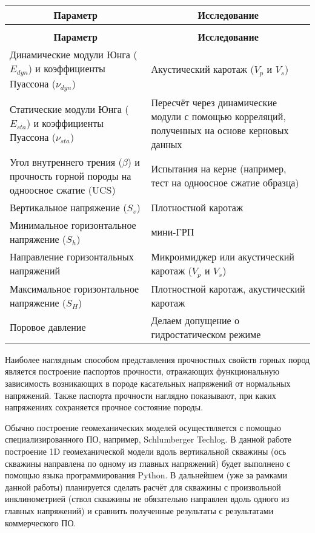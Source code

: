 \small %
\begin{longtable}[c]{|p{8cm}|p{8cm}|}
	\caption{Исходные данные для построения геомеханической модели}%
	\label{tab:long:invest}%
	\\
	\hline
	\multicolumn{1}{|c|}{\textbf{Параметр}}&\multicolumn{1}{|c|}{\textbf{Исследование}}\\ \hline
	\endfirsthead%
	\captionsetup{format=tablenocaption,labelformat=continued} %
	\caption[]{}\\ %
	\hline
	\multicolumn{1}{|c|}{\textbf{Параметр}}&\multicolumn{1}{|c|}{\textbf{Исследование}}\\ \hline
	\endhead
	\hline
	\endfoot
	\hline
	\endlastfoot
	Динамические модули Юнга ($E_{dyn}$) и коэффициенты Пуассона ($\nu_{dyn}$) & Акустический каротаж ($V_p$ и $V_s$)\\ \hline \hline
	Статические модули Юнга ($E_{sta}$) и коэффициенты Пуассона ($\nu_{sta}$) & Пересчёт через динамические модули с помощью корреляций, полученных на основе керновых данных\\ \hline
	Угол внутреннего трения ($\beta$) и прочность горной породы на одноосное сжатие (UCS) & Испытания на керне (например, тест на одноосное сжатие образца)\\ \hline
	Вертикальное напряжение ($S_v$) & Плотностной каротаж\\ \hline
	Минимальное горизонтальное напряжение ($S_h$) & мини-ГРП\\ \hline
	Направление горизонтальных напряжений & Микроимиджер или акустический каротаж ($V_p$ и $V_s$)\\ \hline
	Максимальное горизонтальное напряжение ($S_H$) & Плотностной каротаж, акустический каротаж\\ \hline
	Поровое давление & Делаем допущение о гидростатическом режиме\\ \hline

\end{longtable}
\normalsize%

Наиболее наглядным способом представления прочностных свойств горных пород является построение паспортов прочности, отражающих функциональную зависимость возникающих в породе касательных напряжений от нормальных напряжений.
Также паспорта прочности наглядно показывают, при каких напряжениях сохраняется прочное состояние породы.

Обычно построение геомеханических моделей осуществляется с помощью специализированного ПО, например, Schlumberger Techlog.
В данной работе построение 1D геомеханической модели вдоль вертикальной скважины (ось скважины направлена по одному из главных напряжений) будет выполнено с помощью языка программирования Python.
В дальнейшем (уже за рамками данной работы) планируется сделать расчёт для скважины с произвольной инклинометрией (ствол скважины не обязательно направлен вдоль одного из главных напряжений) и сравнить полученные результаты с результатами коммерческого ПО.

